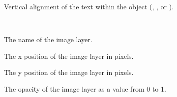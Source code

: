 \documentclass[letterpaper,10pt,english]{sphinxmanual}
\begin{document}
\begin{fulllineitems}
\begin{fulllineitems}
\end{fulllineitems}


\begin{fulllineitems}
\label{index:tmx.Text.valign}
Vertical alignment of the text within the object (,
, or ).

\end{fulllineitems}


\end{fulllineitems}


\begin{fulllineitems}
\label{index:tmx.ImageLayer}~

\begin{fulllineitems}
\label{index:tmx.ImageLayer.name}
The name of the image layer.

\end{fulllineitems}


\begin{fulllineitems}
\label{index:tmx.ImageLayer.offsetx}
The x position of the image layer in pixels.

\end{fulllineitems}


\begin{fulllineitems}
\label{index:tmx.ImageLayer.offsety}
The y position of the image layer in pixels.

\end{fulllineitems}


\begin{fulllineitems}
\label{index:tmx.ImageLayer.opacity}
The opacity of the image layer as a value from 0 to 1.

\end{fulllineitems}


\end{fulllineitems}
\end{document}
